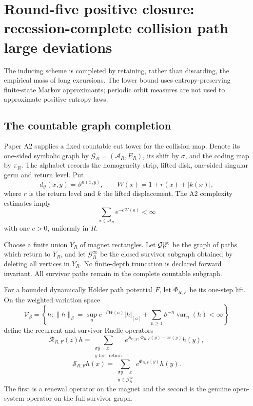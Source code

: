 \section{Round-five positive closure: recession-complete collision path large deviations}
\label{sec:r5-a3}

The inducing scheme is completed by retaining, rather than discarding, the
empirical mass of long excursions.  The lower bound uses entropy-preserving
finite-state Markov approximants; periodic orbit measures are not used to
approximate positive-entropy laws.

\subsection{The countable graph completion}

Paper A2 supplies a fixed countable cut tower for the collision map.  Denote
its one-sided symbolic graph by \(\mathcal G_R=(\mathcal A_R,E_R)\), its shift
by \(\sigma\), and the coding map by \(\pi_R\).  The alphabet records the
homogeneity strip, lifted disk, one-sided singular germ and return level.  Put
\[
 d_\vartheta(x,y)=\vartheta^{n(x,y)},
 \qquad W(x)=1+r(x)+|k(x)|,
\]
where \(r\) is the return level and \(k\) the lifted displacement.  The A2
complexity estimates imply
\[
 \sum_{a\in\mathcal A_R}e^{-cW(a)}<\infty
\]
with one \(c>0\), uniformly in \(R\).

Choose a finite union \(Y_R\) of magnet rectangles.  Let
\(\mathcal G_R^{\rm ret}\) be the graph of paths which return to \(Y_R\), and
let \(\mathcal G_R^{\infty}\) be the closed survivor subgraph obtained by
deleting all vertices in \(Y_R\).  No finite-depth truncation is declared
forward invariant.  All survivor paths remain in the complete countable
subgraph.

For a bounded dynamically H\"older path potential \(F\), let
\(\Phi_{R,F}\) be its one-step lift.  On the weighted variation space
\[
 \mathscr V_\beta=\left\{h:
 \|h\|_\beta=\sup_a e^{-\beta W(a)}|h|_{[a]}
 +\sum_{n\ge1}\vartheta^{-n}\operatorname{var}_n(h)<\infty
 \right\}
\]
define the recurrent and survivor Ruelle operators
\[
 \mathcal R_{R,F}(z)h
 =\sum_{\substack{\sigma y=x\\y\text{ first return}}}
 e^{S_{r(y)}\Phi_{R,F}(y)-zr(y)}h(y),
\]
\[
 \mathcal S_{R,F}h(x)
 =\sum_{\substack{\sigma y=x\\y\in\mathcal G_R^\infty}}
 e^{\Phi_{R,F}(y)}h(y).
\]
The first is a renewal operator on the magnet and the second is the genuine
open-system operator on the full survivor graph.

